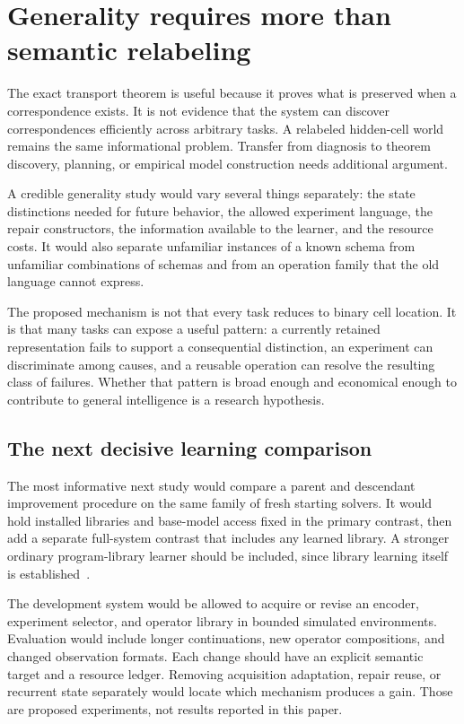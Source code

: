 \documentclass[11pt,letterpaper]{article}
\theoremstyle{plain}
\theoremstyle{definition}
\begin{document}
\section{Generality requires more than semantic relabeling}\label{sec:generality}
The exact transport theorem is useful because it proves what is preserved when a correspondence exists. It is not evidence that the system can discover correspondences efficiently across arbitrary tasks. A relabeled hidden-cell world remains the same informational problem. Transfer from diagnosis to theorem discovery, planning, or empirical model construction needs additional argument.

A credible generality study would vary several things separately: the state distinctions needed for future behavior, the allowed experiment language, the repair constructors, the information available to the learner, and the resource costs. It would also separate unfamiliar instances of a known schema from unfamiliar combinations of schemas and from an operation family that the old language cannot express.

The proposed mechanism is not that every task reduces to binary cell location. It is that many tasks can expose a useful pattern: a currently retained representation fails to support a consequential distinction, an experiment can discriminate among causes, and a reusable operation can resolve the resulting class of failures. Whether that pattern is broad enough and economical enough to contribute to general intelligence is a research hypothesis.

\subsection{The next decisive learning comparison}
The most informative next study would compare a parent and descendant improvement procedure on the same family of fresh starting solvers. It would hold installed libraries and base-model access fixed in the primary contrast, then add a separate full-system contrast that includes any learned library. A stronger ordinary program-library learner should be included, since library learning itself is established~\cite{dreamcoder}.

The development system would be allowed to acquire or revise an encoder, experiment selector, and operator library in bounded simulated environments. Evaluation would include longer continuations, new operator compositions, and changed observation formats. Each change should have an explicit semantic target and a resource ledger. Removing acquisition adaptation, repair reuse, or recurrent state separately would locate which mechanism produces a gain. Those are proposed experiments, not results reported in this paper.
\end{document}
